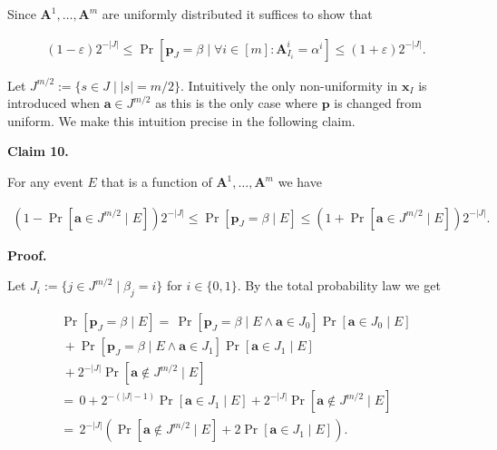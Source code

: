 \documentclass[10pt,a4paper]{article}
\begin{document}
Since $\bm{A}^{1},\dots,\bm{A}^{m}$ are uniformly distributed it suffices to show that\par


\[\begin{gathered}
(1-\varepsilon)2^{-|J|}\leq\Pr[\bm{p}_{J}=\beta\mid\forall i\in[m]:\bm{A}^{i}_{I_{i}}=\alpha^{i}]\leq(1+\varepsilon)2^{-|J|}.
\end{gathered}\]


Let
$J^{m/2}:=\{s\in J\mid|s|=m/2\}.$
Intuitively the only non-uniformity in $\bm{x}_{I}$ is introduced when $\bm{a}\in J^{m/2}$ as this is the
only case where $\bm{p}$ is changed from uniform. We make this intuition precise in the following claim.\par





\par\medskip\noindent\textbf{
Claim 10. 
}\par



For any event $E$ that is a function of $\bm{A}^{1},\ldots,\bm{A}^{m}$ we have\par


\[\begin{gathered}
(1-\Pr[\bm{a}\in J^{m/2}\mid E])2^{-|J|}\leq\Pr[\bm{p}_{J}=\beta\mid E]\leq(1+\Pr[\bm{a}\in J^{m/2}\mid E])2^{-|J|}.
\end{gathered}\]






\par\medskip\noindent\textbf{
\textbf{Proof}.}\par




Let $J_{i}:=\{j\in J^{m/2}\mid\beta_{j}=i\}$ for $i\in\{0,1\}$. By the total probability law we get\par


\[\begin{gathered}
\displaystyle\Pr[\bm{p}_{J}=\beta\mid E]= \displaystyle\,\Pr[\bm{p}_{J}=\beta\mid E\land\bm{a}\in J_{0}]\Pr[\bm{a}\in J_{0}\mid E] \\
\displaystyle\,+\Pr[\bm{p}_{J}=\beta\mid E\land\bm{a}\in J_{1}]\Pr[\bm{a}\in J_{1}\mid E] \\
\displaystyle\,+2^{-|J|}\Pr[\bm{a}\not\in J^{m/2}\mid E] \\
\displaystyle= \displaystyle\,0+2^{-(|J|-1)}\Pr[\bm{a}\in J_{1}\mid E]+2^{-|J|}\Pr[\bm{a}\not\in J^{m/2}\mid E] \\
\displaystyle= \displaystyle\,2^{-|J|}(\Pr[\bm{a}\not\in J^{m/2}\mid E]+2\Pr[\bm{a}\in J_{1}\mid E]).
\end{gathered}\]
\end{document}
